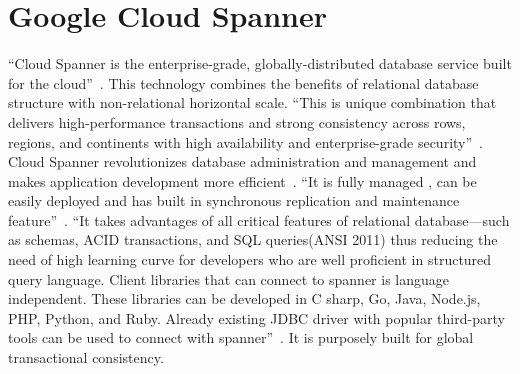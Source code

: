 \section{Google Cloud Spanner}

``Cloud Spanner is the enterprise-grade, globally-distributed database 
service built for the cloud''~\cite{hid-sp18-523-www-google-spanner}. 
This technology combines the benefits of relational database structure 
with non-relational horizontal scale. ``This is unique combination that 
delivers high-performance transactions and strong consistency across rows, 
regions, and continents with high availability and enterprise-grade 
security''~\cite{hid-sp18-523-www-google-spanner}. Cloud Spanner 
revolutionizes database administration and management and makes 
application development more efficient~\cite{hid-sp18-523-www-google-spanner}.
``It is fully managed , can be easily deployed and has built in synchronous 
replication and maintenance feature''~\cite{hid-sp18-523-www-google-spanner}. 
``It takes advantages of all critical features of relational database—such 
as schemas, ACID transactions, and SQL queries(ANSI 2011) thus reducing 
the need of high learning curve for developers who are well proficient in 
structured query language. 
Client libraries that can connect to spanner is language independent. 
These libraries can be developed in C sharp, Go, Java, Node.js, PHP, Python, 
and Ruby. Already existing JDBC driver with popular third-party tools can be 
used to connect with spanner''~\cite{hid-sp18-523-www-google-spanner}. It is 
purposely built for global transactional consistency.
